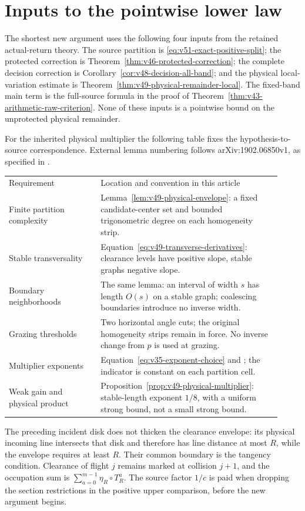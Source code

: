 \section{Inputs to the pointwise lower law}
\label{app:v51-input-map}
The shortest new argument uses the following four inputs from the
retained actual-return theory. The source partition is
\eqref{eq:v51-exact-positive-split}; the protected correction is
Theorem~\ref{thm:v46-protected-correction}; the complete decision
correction is Corollary~\ref{cor:v48-decision-all-band}; and the
physical local-variation estimate is
Theorem~\ref{thm:v49-physical-remainder-local}. The fixed-band main
term is the full-source formula in the proof of
Theorem~\ref{thm:v43-arithmetic-raw-criterion}. None of these inputs
is a pointwise bound on the unprotected physical remainder.

For the inherited physical multiplier the following table fixes the
hypothesis-to-source correspondence. External lemma numbering follows
arXiv:1902.06850v1, as specified in \cite{DPZ}.

\smallskip
\noindent\begin{tabular}{p{0.31\linewidth}p{0.61\linewidth}}
Requirement & Location and convention in this article\\[3pt]
Finite partition complexity & Lemma~\ref{lem:v49-physical-envelope}: a fixed candidate-center set and bounded trigonometric degree on each homogeneity strip.\\[3pt]
Stable transversality & Equation~\eqref{eq:v49-transverse-derivatives}: clearance levels have positive slope, stable graphs negative slope.\\[3pt]
Boundary neighborhoods & The same lemma: an interval of width $s$ has length $O(s)$ on a stable graph; coalescing boundaries introduce no inverse width.\\[3pt]
Grazing thresholds & Two horizontal angle cuts; the original homogeneity strips remain in force. No inverse change from $p$ is used at grazing.\\[3pt]
Multiplier exponents & Equation~\eqref{eq:v35-exponent-choice} and \cite[Lemma 3.3(b)]{DPZ}; the indicator is constant on each partition cell.\\[3pt]
Weak gain and physical product & Proposition~\ref{prop:v49-physical-multiplier}: stable-length exponent $1/8$, with a uniform strong bound, not a small strong bound.\\
\end{tabular}
\smallskip

The preceding incident disk does not thicken the clearance envelope:
its physical incoming line intersects that disk and therefore has
line distance at most $R$, while the envelope requires at least $R$.
Their common boundary is the tangency condition. Clearance of flight
$j$ remains marked at collision $j+1$, and the occupation sum is
$\sum_{a=0}^{m-1}\eta_R\circ T_R^a$. The source factor $1/c$ is
paid when dropping the section restrictions in the positive upper
comparison, before the new argument begins.

